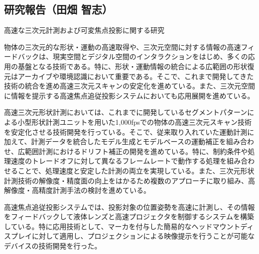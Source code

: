 \subsection{研究報告（田畑 智志）}

高速な三次元計測および可変焦点投影に関する研究

物体の三次元的な形状・運動の高速取得や、三次元空間に対する情報の高速フィードバックは、現実空間とデジタル空間のインタラクションをはじめ、多くの応用の基盤となる技術である。特に、形状・運動情報の統合による広範囲の形状復元はアーカイブや環境認識において重要である。そこで、これまで開発してきた技術の統合を進め高速三次元スキャンの安定化を進めている。また、三次元空間に情報を提示する高速焦点追従投影システムにおいても応用展開を進めている。

高速三次元形状計測においては、これまでに開発しているセグメントパターンによる小型形状計測ユニットを用いた1,000fpsでの物体の高速三次元スキャン技術を安定化させる技術開発を行っている。そこで、従来取り入れていた運動計測に加えて、計測データを統合したモデル生成とモデルベースの運動補正を組み合わせ、広範囲計測におけるドリフト補正の開発を進めている。特に、制約条件や処理速度のトレードオフに対して異なるフレームレートで動作する処理を組み合わせることで、処理速度と安定した計測の両立を実現している。また、三次元形状計測技術の解像度・精度面の向上をはかるため複数のアプローチに取り組み、高解像度・高精度計測手法の検討を進めている。

高速焦点追従投影システムでは、投影対象の位置姿勢を高速に計測し、その情報をフィードバックして液体レンズと高速プロジェクタを制御するシステムを構築している。特に応用技術として、マーカを付与した簡易的なヘッドマウントディスプレイに対して適用し、プロジェクションによる映像提示を行うことが可能なデバイスの技術開発を行った。

